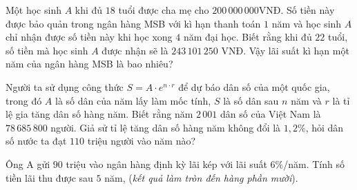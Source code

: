 \begin{ex}%
	Một học sinh $A$ khi đủ $18$ tuổi được cha mẹ cho $200\,000\,000$VNĐ. Số tiền này được bảo quản trong ngân hàng MSB với kì hạn thanh toán $1$ năm và học sinh $A$ chỉ nhận được số tiền này khi học xong $4$ năm đại học. Biết rằng khi đủ $22$ tuổi, số tiền mà học sinh $A$ được nhận  sẽ là $243\,101\,250$ VNĐ. Vậy lãi suất kì hạn một năm của ngân hàng MSB là bao nhiêu?
\end{ex}

\begin{ex}%
	Người ta sử dụng công thức $S=A\cdot e^{n\cdot r}$ để dự báo dân số của một quốc gia, trong đó $A$ là số dân của năm lấy làm mốc tính, $S$ là số dân sau $n$ năm và $r$ là tỉ lệ gia tăng dân số hàng năm.  Biết rằng năm $2\,001$ dân số của Việt Nam là $78\, 685\, 800$ người. Giả sử tỉ lệ tăng dân số hàng năm không đổi là $1{,}2\%$, hỏi dân số nước ta đạt $110$ triệu người vào năm nào?
\end{ex}

\begin{bt}%
	 			Ông A gửi $90$ triệu vào ngân hàng định kỳ lãi kép với lãi suất $6\%$/năm. Tính số tiền lãi thu được sau $5$ năm, (\textit{kết quả làm tròn đến hàng phần mười}).
	 	\end{bt}

